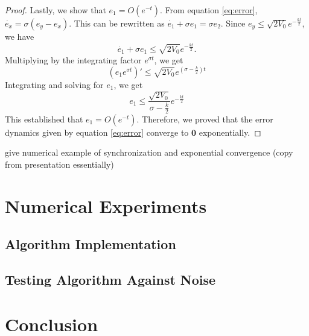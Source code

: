 \documentclass[12pt]{article}
\begin{document}
\begin{proof}
        Lastly, we show that $e_1 = O(e^{-t})$. From equation \ref{eq:error}, $\dot{e_x} = \sigma (e_y - e_x)$. This can be rewritten as $\dot{e_1} + \sigma e_1 = \sigma e_2$. Since $e_y \leq \sqrt{2V_0} e^{-\frac{kt}{2}}$, we have 
        \begin{equation*} 
          \dot{e_1} + \sigma e_1 \leq \sqrt{2V_0} e^{-\frac{kt}{2}}. 
        \end{equation*}
        Multiplying by the integrating factor $e^{\sigma t}$, we get 
        \begin{equation*} 
          (e_1 e^{\sigma t})' \leq \sqrt{2V_0} e^{\left( \sigma - \frac{k}{2} \right)t} 
        \end{equation*}
        Integrating and solving for $e_1$, we get 
        \begin{equation*} 
          e_1 \leq \frac{\sqrt{2V_0}}{\sigma - \frac{k}{2}} e^{-\frac{kt}{2}}
        \end{equation*}
        This established that $e_1 = O(e^{-t})$. Therefore, we proved that the error dynamics given by equation \ref{eq:error} converge to $\mathbf{0}$ exponentially. 
      \end{proof}
      give numerical example of synchronization and exponential convergence (copy from presentation essentially)
    \section{Numerical Experiments}
    \subsection{Algorithm Implementation}
    \subsection{Testing Algorithm Against Noise}
    \section{Conclusion}
  \newpage    
    \printbibliography
\end{document}
